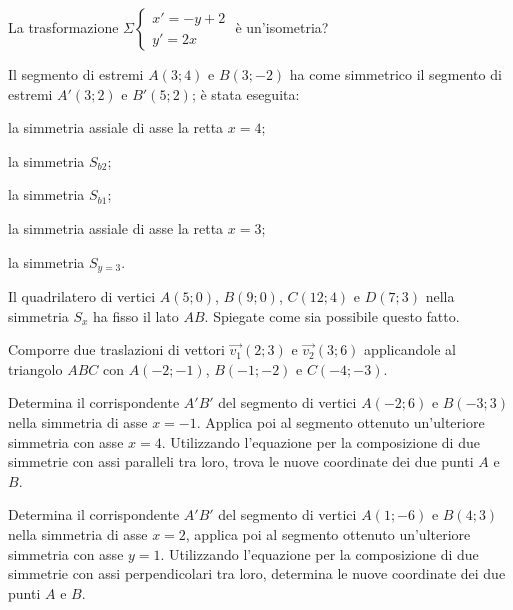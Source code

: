 \begin{esercizio}
	\label{ese:8.88} %
	La trasformazione $\Sigma \begin{cases}x'=-y+2\\y'=2x\end{cases}$ è 
	un'isometria?
\end{esercizio}

\begin{esercizio}
	\label{ese:8.89} %
	Il segmento di estremi $A(3;4)$ e $B(3;-2)$ ha come simmetrico il 
	segmento di estremi $A'(3;2)$ e $B'(5;2)$; è stata eseguita:
	\begin{enumeratea}
		\item la simmetria assiale di asse la retta $x=4$;
		\item la simmetria $S_{b2}$;
		\item la simmetria $S_{b1}$;
		\item la simmetria assiale di asse la retta $x=3$;
		\item la simmetria $S_{y=3}$.
	\end{enumeratea}
\end{esercizio}

\begin{esercizio}
	\label{ese:8.91} %
	Il quadrilatero di vertici $A(5;0)$, $B(9;0)$, $C(12;4)$ e $D(7;3)$ 
	nella simmetria $S_x$ ha fisso il lato $AB$. Spiegate come sia 
	possibile questo fatto.
\end{esercizio}

\begin{esercizio}
	\label{ese:8.97} %
	Comporre due traslazioni di vettori $\vec{v_1}(2;3)$ e 
	$\vec{v_2}(3;6)$ applicandole al triangolo $ABC$ con $A(-2;-1)$, 
	$B(-1;-2)$ e $C(-4;-3)$.
\end{esercizio}

\begin{esercizio}
	\label{ese:8.98} %
	Determina il corrispondente $A'B'$ del segmento di vertici $A(-2;6)$ 
	e $B(-3;3)$ nella simmetria di asse $x=-1$. Applica poi al segmento 
	ottenuto un'ulteriore simmetria con asse $x=4$. Utilizzando 
	l'equazione per la composizione di due simmetrie con assi paralleli 
	tra loro, trova le nuove coordinate dei due punti $A$ e $B$.
\end{esercizio}

\begin{esercizio}
	\label{ese:8.99} %
	Determina il corrispondente $A'B'$ del segmento di vertici $A(1;-6)$ 
	e $B(4;3)$ nella simmetria di asse $x = 2$, applica poi al segmento 
	ottenuto un'ulteriore simmetria con asse $y = 1$. Utilizzando 
	l'equazione per la composizione di due simmetrie con assi 
	perpendicolari tra loro, determina le nuove coordinate dei due punti 
	$A$ e $B$.
\end{esercizio}

